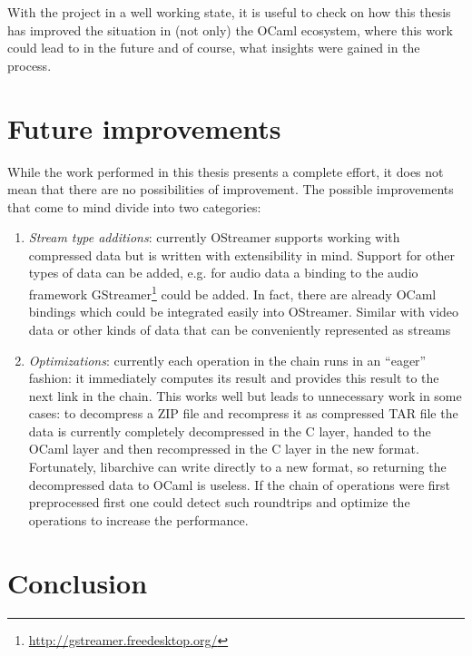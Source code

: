\documentclass[parskip=half]{scrreprt}
\begin{document}
With the project in a well working state, it is useful to check on how this
thesis has improved the situation in (not only) the OCaml ecosystem, where this
work could lead to in the future and of course, what insights were gained in
the process.

\section{Future improvements}
\label{sec:future}

While the work performed in this thesis presents a complete effort, it does not
mean that there are no possibilities of improvement. The possible improvements
that come to mind divide into two categories:

\begin{enumerate}
  \item \emph{Stream type additions}: currently OStreamer supports working with
    compressed data but is written with extensibility in mind. Support for
    other types of data can be added, e.g. for audio data a binding to the
    audio framework GStreamer\footnote{\url{http://gstreamer.freedesktop.org/}}
    could be added. In fact, there are already OCaml bindings which could be
    integrated easily into OStreamer. Similar with video data or other kinds of
    data that can be conveniently represented as streams
  \item \emph{Optimizations}: currently each operation in the chain runs in an
    \enquote{eager} fashion: it immediately computes its result and provides
    this result to the next link in the chain. This works well but leads to
    unnecessary work in some cases: to decompress a ZIP file and recompress it
    as compressed TAR file the data is currently completely decompressed in
    the C layer, handed to the OCaml layer and then recompressed in the C layer
    in the new format. Fortunately, libarchive can write directly to a new
    format, so returning the decompressed data to OCaml is useless.  If the
    chain of operations were first preprocessed first one could detect such
    roundtrips and optimize the operations to increase the performance.
\end{enumerate}

\section{Conclusion}
\label{sec:conclusion}

\end{document}
